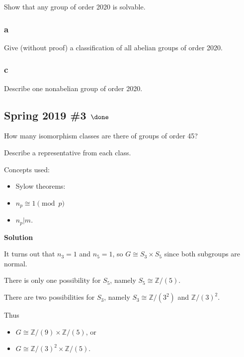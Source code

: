 Show that any group of order 2020 is solvable.

\hypertarget{a-20}{%
\subsubsection{a}\label{a-20}}

Give (without proof) a classification of all abelian groups of order
2020.

\hypertarget{c-12}{%
\subsubsection{c}\label{c-12}}

Describe one nonabelian group of order 2020.


\hypertarget{spring-2019-3-done}{%
\subsection{\texorpdfstring{Spring 2019 \#3
\(\done\)}{Spring 2019 \#3 \textbackslash done}}\label{spring-2019-3-done}}

How many isomorphism classes are there of groups of order 45?

Describe a representative from each class.

\begin{solution}

Concepts used:

\begin{itemize}
\tightlist
\item
  Sylow theorems:
\item
  \(n_p \cong 1 \pmod p\)
\item
  \(n_p \mathrel{\Big|}m\).
\end{itemize}

\textbf{Solution}

It turns out that \(n_3 = 1\) and \(n_5 = 1\), so
\(G \cong S_3 \times S_5\) since both subgroups are normal.

There is only one possibility for \(S_5\), namely
\(S_5\cong {\mathbb{Z}}/(5)\).

There are two possibilities for \(S_3\), namely
\(S_3 \cong {\mathbb{Z}}/(3^2)\) and \({\mathbb{Z}}/(3)^2\).

Thus

\begin{itemize}
\tightlist
\item
  \(G \cong {\mathbb{Z}}/(9) \times{\mathbb{Z}}/(5)\), or
\item
  \(G \cong {\mathbb{Z}}/(3)^2 \times{\mathbb{Z}}/(5)\).
\end{itemize}


\end{solution}

